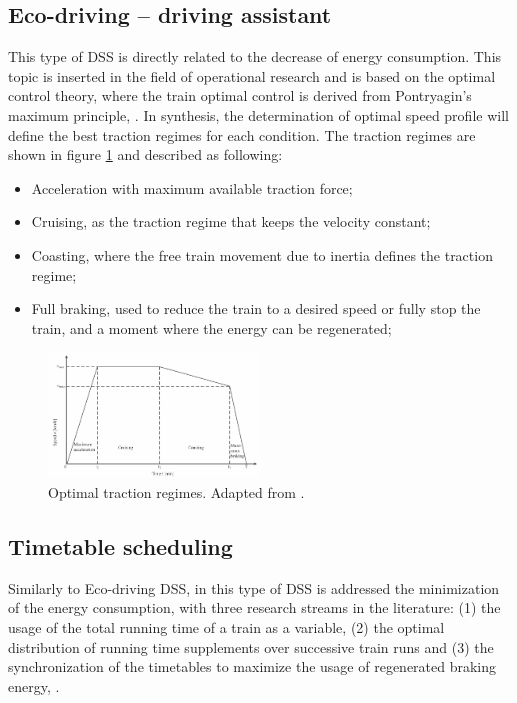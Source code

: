 \subsection{Eco-driving – driving assistant}
\label{subs:352}

	This type of \ac{DSS} is directly related to the decrease of energy consumption. This topic is inserted in the field of operational research and is based on the optimal control theory, where the train optimal control is derived from Pontryagin's maximum principle, \cite{pontryagin1963}.  
	In synthesis, the determination of optimal speed profile will define the best traction regimes for each condition. The traction regimes are shown in figure \ref{fig:scheepmaker2017a} and described as following:
	
	\begin{itemize}
		\setlength\itemsep{-0.5em}
		\item Acceleration with maximum available traction force;
		\item Cruising, as the traction regime that keeps the velocity constant;
		\item Coasting, where the free train movement due to inertia defines the traction regime;
		\item Full braking, used to reduce the train to a desired speed or fully stop the train, and a moment where the energy can be regenerated;
	\end{itemize}
	
	\begin{figure}[h!]
		\centering
		\includegraphics[width=0.5\textwidth,keepaspectratio]{figures/35.DSS/scheepmaker2017a}
		\caption{Optimal traction regimes. Adapted from \cite{scheepmaker2017}.}
		\label{fig:scheepmaker2017a}
	\end{figure}
	
	

\subsection{Timetable scheduling}
\label{subs:353}

	Similarly to Eco-driving \ac{DSS}, in this type of \ac{DSS} is addressed the minimization of the energy consumption, with three research streams in the literature: (1) the usage of the total running time of a train as a variable, (2) the optimal distribution of running time supplements over successive train runs and (3) the synchronization of the timetables to maximize the usage of regenerated braking energy, \cite{scheepmaker2017}.
	
	
	
